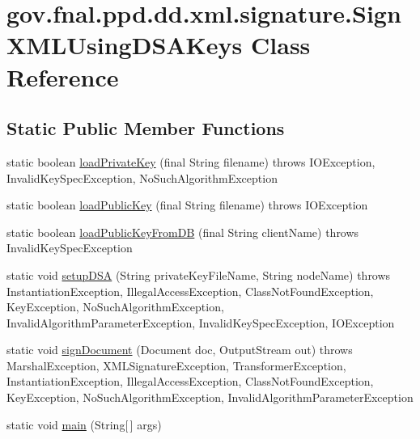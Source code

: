 \hypertarget{classgov_1_1fnal_1_1ppd_1_1dd_1_1xml_1_1signature_1_1SignXMLUsingDSAKeys}{\section{gov.\-fnal.\-ppd.\-dd.\-xml.\-signature.\-Sign\-X\-M\-L\-Using\-D\-S\-A\-Keys Class Reference}
\label{classgov_1_1fnal_1_1ppd_1_1dd_1_1xml_1_1signature_1_1SignXMLUsingDSAKeys}
}
\subsection*{Static Public Member Functions}
\begin{DoxyCompactItemize}
\item 
static boolean \hyperlink{classgov_1_1fnal_1_1ppd_1_1dd_1_1xml_1_1signature_1_1SignXMLUsingDSAKeys_adf116a793a94389c6e5117b275e6e831}{load\-Private\-Key} (final String filename)  throws I\-O\-Exception, Invalid\-Key\-Spec\-Exception, No\-Such\-Algorithm\-Exception 
\item 
static boolean \hyperlink{classgov_1_1fnal_1_1ppd_1_1dd_1_1xml_1_1signature_1_1SignXMLUsingDSAKeys_af66415b0a2f20bf6149b9d0cb8c64e33}{load\-Public\-Key} (final String filename)  throws I\-O\-Exception 
\item 
static boolean \hyperlink{classgov_1_1fnal_1_1ppd_1_1dd_1_1xml_1_1signature_1_1SignXMLUsingDSAKeys_a309817e89eb4349b00220e86dd5576ec}{load\-Public\-Key\-From\-D\-B} (final String client\-Name)  throws Invalid\-Key\-Spec\-Exception 
\item 
static void \hyperlink{classgov_1_1fnal_1_1ppd_1_1dd_1_1xml_1_1signature_1_1SignXMLUsingDSAKeys_abb9261a032fa3b30e53b00cc00951a1f}{setup\-D\-S\-A} (String private\-Key\-File\-Name, String node\-Name)  throws Instantiation\-Exception, Illegal\-Access\-Exception, Class\-Not\-Found\-Exception, Key\-Exception, No\-Such\-Algorithm\-Exception, 			\-Invalid\-Algorithm\-Parameter\-Exception, Invalid\-Key\-Spec\-Exception, I\-O\-Exception 
\item 
static void \hyperlink{classgov_1_1fnal_1_1ppd_1_1dd_1_1xml_1_1signature_1_1SignXMLUsingDSAKeys_a69c317767c62c0502026667b6366f1e1}{sign\-Document} (Document doc, Output\-Stream out)  throws Marshal\-Exception, X\-M\-L\-Signature\-Exception, Transformer\-Exception, Instantiation\-Exception, Illegal\-Access\-Exception, 			\-Class\-Not\-Found\-Exception, Key\-Exception, No\-Such\-Algorithm\-Exception, Invalid\-Algorithm\-Parameter\-Exception 
\item 
static void \hyperlink{classgov_1_1fnal_1_1ppd_1_1dd_1_1xml_1_1signature_1_1SignXMLUsingDSAKeys_a2d236c020bc49fdb4733a457151ca2cd}{main} (String\mbox{[}$\,$\mbox{]} args)
\end{DoxyCompactItemize}



